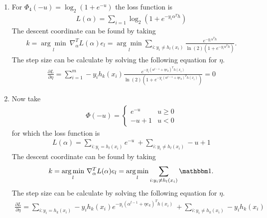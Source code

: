 \documentclass[11pt,letter]{article}
\begin{document}
\begin{enumerate}
\begin{enumerate}
    \item For $\Phi_4(-u) = \log_2(1 + e^{-u})$ the loss function is
    \begin{align*}
        L(\alpha) = \sum_{i=1} \log_2(1 + e^{-y_i\alpha^Th})
    \end{align*}
    The descent coordinate can be found by taking
    \begin{align*}
        k = \underset{l}{\arg \min} \ \nabla_\alpha^T L(\alpha) e_l = \underset{l}{\arg \min} \sum_{i:y_i \neq h_l(x_i)} \frac{e^{-y_i\alpha^Th}}{\ln (2) (1+e^{-y_i\alpha^Th})}.
    \end{align*}
    The step size can be calculate by solving the following equation for $\eta$.
    \begin{align*}
        \frac{\partial L}{\partial \eta} = \sum_{i=1}^m -y_ih_k(x_i) \frac{e^{-y_i(\alpha^{t-1} + \eta e_k)^T h (x_i)}}{\ln (2) (1+e^{-y_i(\alpha^{t-1} + \eta e_k)^T h (x_i)})} = 0
    \end{align*}
    \item Now take
    \begin{align*}
        \Phi(-u) = \begin{cases}
            e^{-u} & u \ge 0 \\ -u + 1 & u < 0
        \end{cases}
    \end{align*}
    for which the loss function is
    \begin{align*}
        L(\alpha) = \sum_{i:y_i = h_l(x_i)} e^{-u} \ + \sum_{i:y_i \neq h_l(x_i)} -u + 1
    \end{align*}
    The descent coordinate can be found by taking
    \begin{align*}
        k = \underset{l}{\arg \min} \ \nabla_\alpha^T L(\alpha) e_l = \underset{l}{\arg \min} \sum_{i:y_i \neq h_l(x_i)} \mathbbm 1.
    \end{align*}
    The step size can be calculate by solving the following equation for $\eta$.
    \begin{align*}
        \frac{\partial L}{\partial \eta} = \sum_{i:y_i = h_k(x_i)} -y_ih_k(x_i)e^{-y_i(\alpha^{t-1} + \eta e_k)^T h (x_i)} \ + \sum_{i:y_i \neq h_k(x_i)} -y_ih_k(x_i)
    \end{align*}
    \end{enumerate}


\end{enumerate}
\end{document}
